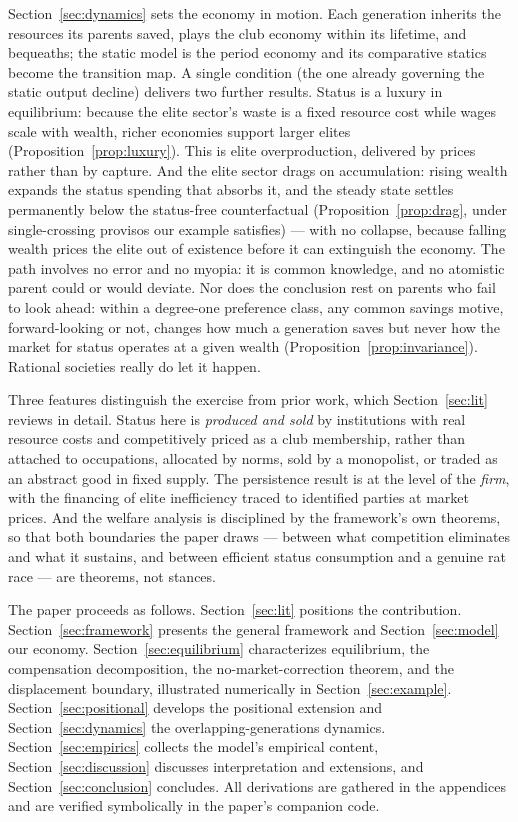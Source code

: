 \documentclass[12pt,letterpaper]{article}
\theoremstyle{definition}
\begin{document}
Section~\ref{sec:dynamics} sets the economy in motion.
Each generation inherits the resources its parents saved, plays the club economy within its lifetime, and bequeaths; the static model is the period economy and its comparative statics become the transition map.
A single condition (the one already governing the static output decline) delivers two further results.
Status is a luxury in equilibrium: because the elite sector's waste is a fixed resource cost while wages scale with wealth, richer economies support larger elites (Proposition~\ref{prop:luxury}).
This is elite overproduction, delivered by prices rather than by capture.
And the elite sector drags on accumulation: rising wealth expands the status spending that absorbs it, and the steady state settles permanently below the status-free counterfactual (Proposition~\ref{prop:drag}, under single-crossing provisos our example satisfies) --- with no collapse, because falling wealth prices the elite out of existence before it can extinguish the economy.
The path involves no error and no myopia: it is common knowledge, and no atomistic parent could or would deviate.
Nor does the conclusion rest on parents who fail to look ahead: within a degree-one preference class, any common savings motive, forward-looking or not, changes how much a generation saves but never how the market for status operates at a given wealth (Proposition~\ref{prop:invariance}).
Rational societies really do let it happen.

Three features distinguish the exercise from prior work, which Section~\ref{sec:lit} reviews in detail.
Status here is \emph{produced and sold} by institutions with real resource costs and competitively priced as a club membership, rather than attached to occupations, allocated by norms, sold by a monopolist, or traded as an abstract good in fixed supply.
The persistence result is at the level of the \emph{firm}, with the financing of elite inefficiency traced to identified parties at market prices.
And the welfare analysis is disciplined by the framework's own theorems, so that both boundaries the paper draws --- between what competition eliminates and what it sustains, and between efficient status consumption and a genuine rat race --- are theorems, not stances.

The paper proceeds as follows.
Section~\ref{sec:lit} positions the contribution.
Section~\ref{sec:framework} presents the general framework and Section~\ref{sec:model} our economy.
Section~\ref{sec:equilibrium} characterizes equilibrium, the compensation decomposition, the no-market-correction theorem, and the displacement boundary, illustrated numerically in Section~\ref{sec:example}.
Section~\ref{sec:positional} develops the positional extension and Section~\ref{sec:dynamics} the overlapping-generations dynamics.
Section~\ref{sec:empirics} collects the model's empirical content, Section~\ref{sec:discussion} discusses interpretation and extensions, and Section~\ref{sec:conclusion} concludes.
All derivations are gathered in the appendices and are verified symbolically in the paper's companion code.
\end{document}
